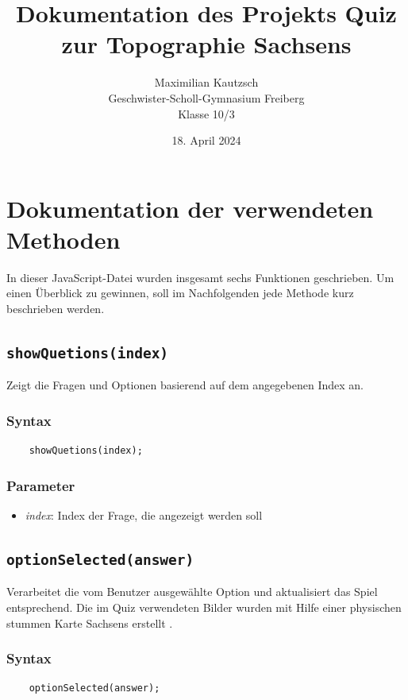 \documentclass[10pt, fleqn]{scrartcl}
\title{Dokumentation des Projekts \glqq{}Quiz zur Topographie Sachsens\grqq{}}
\date{18. April 2024}
\author{Maximilian Kautzsch
	\\ Geschwister-Scholl-Gymnasium Freiberg 
	\\ Klasse 10/3}
\begin{document}
\maketitle


\section{Dokumentation der verwendeten Methoden}

In dieser JavaScript-Datei wurden insgesamt sechs Funktionen geschrieben. Um einen Überblick zu gewinnen, soll im Nachfolgenden jede Methode kurz beschrieben werden.

\subsection{\texttt{showQuetions(index)}}
Zeigt die Fragen und Optionen basierend auf dem angegebenen Index an.

\subsubsection*{Syntax}
\begin{lstlisting}
	showQuetions(index);
\end{lstlisting}

\subsubsection*{Parameter}
\begin{itemize}
	\item \textit{index}: Index der Frage, die angezeigt werden soll
\end{itemize}

\subsection{\texttt{optionSelected(answer)}}
Verarbeitet die vom Benutzer ausgewählte Option und aktualisiert das Spiel entsprechend. Die im Quiz verwendeten Bilder wurden mit Hilfe einer physischen stummen Karte Sachsens erstellt \cite{diercke:map}.

\subsubsection*{Syntax}
\begin{lstlisting}
	optionSelected(answer);
\end{lstlisting}
\end{document}
